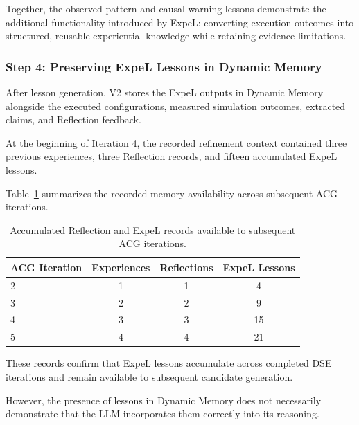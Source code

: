 Together, the observed-pattern and
causal-warning lessons demonstrate
the additional functionality introduced
by ExpeL: converting execution outcomes
into structured, reusable experiential
knowledge while retaining evidence
limitations.



\subsubsection{Step 4: Preserving ExpeL Lessons in Dynamic Memory}

After lesson generation, V2 stores the
ExpeL outputs in Dynamic Memory alongside
the executed configurations, measured
simulation outcomes, extracted claims,
and Reflection feedback.

At the beginning of Iteration 4, the
recorded refinement context contained
three previous experiences, three
Reflection records, and fifteen
accumulated ExpeL lessons.

Table~\ref{tab:app_v2_memory_growth}
summarizes the recorded memory availability
across subsequent ACG iterations.

\begin{table}[htbp]
\centering
\caption{Accumulated Reflection and ExpeL
records available to subsequent ACG iterations.}
\label{tab:app_v2_memory_growth}
\renewcommand{\arraystretch}{1.15}
\small
\begin{tabular}{lccc}
\toprule
\textbf{ACG Iteration} &
\textbf{Experiences} &
\textbf{Reflections} &
\textbf{ExpeL Lessons} \\
\midrule
2 & 1 & 1 & 4 \\
3 & 2 & 2 & 9 \\
4 & 3 & 3 & 15 \\
5 & 4 & 4 & 21 \\
\bottomrule
\end{tabular}
\end{table}

These records confirm that ExpeL lessons
accumulate across completed DSE iterations
and remain available to subsequent
candidate generation.

However, the presence of lessons in
Dynamic Memory does not necessarily
demonstrate that the LLM incorporates
them correctly into its reasoning.




